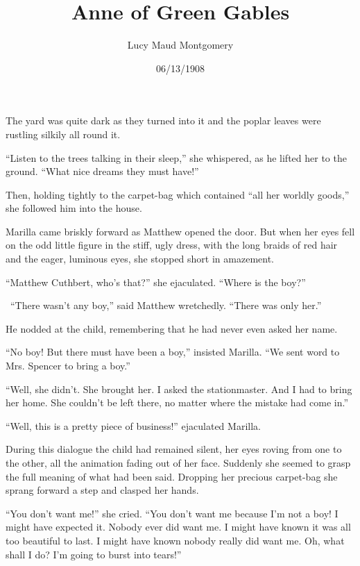 \documentclass[a4paper]{article}
\title{Anne of Green Gables}
\author{Lucy Maud Montgomery}
\date{06/13/1908}
\begin{document}
\maketitle
\the\baselineskip



\Huge
\the\baselineskip
\bfseries
{\tiny The yard was quite dark as they turned into it and the poplar leaves were rustling silkily all round it.

``Listen to the trees talking in their sleep,'' she whispered, as he lifted her to the ground. ``What nice dreams they must have!''

Then, holding tightly to the carpet-bag which contained ``all her worldly goods,'' she followed him into the house.

Marilla came briskly forward as Matthew opened the door. But when her eyes fell on the odd little figure in the stiff, ugly dress, with the long braids of red hair and the eager, luminous eyes, she stopped short in amazement.

``Matthew Cuthbert, who's that?'' she ejaculated. ``Where is the boy?''

\the\baselineskip\ \tiny{``There wasn't any boy,'' said Matthew wretchedly. ``There was only her.''}}

{\scriptsize He nodded at the child, remembering that he had never even asked her name.

``No boy! But there must have been a boy,'' insisted Marilla. ``We sent word to Mrs. Spencer to bring a boy.''

``Well, she didn't. She brought her. I asked the stationmaster. And I had to bring her home. She couldn't be left there, no matter where the mistake had come in.''

``Well, this is a pretty piece of business!'' ejaculated Marilla.

During this dialogue the child had remained silent, her eyes roving from one to the other, all the animation fading out of her face. Suddenly she seemed to grasp the full meaning of what had been said. Dropping her precious carpet-bag she sprang forward a step and clasped her hands.

``You don't want me!'' she cried. ``You don't want me because I'm not a boy! I might have expected it. Nobody ever did want me. I might have known it was all too beautiful to last. I might have known nobody really did want me. Oh, what shall I do? I'm going to burst into tears!''}
\end{document}
